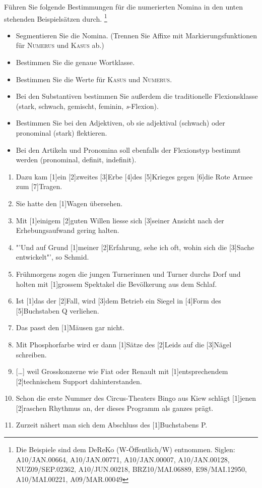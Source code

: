 \begin{sloppypar}

\Uebung \label{u81} Führen Sie folgende Bestimmungen für die numerierten Nomina in den unten stehenden Beispielsätzen durch.%
\footnote{Die Beispiele sind dem DeReKo (W-Öffentlich\slash W) entnommen.
Siglen: A10\slash JAN.00664, A10\slash JAN.00771, A10\slash JAN.00007, A10\slash JAN.00128, NUZ09\slash SEP.02362, A10\slash JUN.00218, BRZ10\slash MAI.06889, E98\slash MAI.12950, A10\slash MAI.00221, A09\slash MAR.00049}

\begin{itemize}\Lf
  \item Segmentieren Sie die Nomina. (Trennen Sie Affixe mit Markierungsfunktionen für \textsc{Numerus} und \textsc{Kasus} ab.)
  \item Bestimmen Sie die genaue Wortklasse.
  \item Bestimmen Sie die Werte für \textsc{Kasus} und \textsc{Numerus}.
  \item Bei den Substantiven bestimmen Sie außerdem die traditionelle Flexionsklasse (stark, schwach, gemischt, feminin, \textit{s}-Flexion).
  \item Bestimmen Sie bei den Adjektiven, ob sie adjektival (schwach) oder pronominal (stark) flektieren.
  \item Bei den Artikeln und Pronomina soll ebenfalls der Flexionstyp bestimmt werden (pronominal, definit, indefinit).
\end{itemize}

\begin{enumerate}\Lf
  \item Dazu kam [1]ein [2]zweites [3]Erbe [4]des [5]Krieges gegen [6]die Rote Armee zum [7]Tragen.
  \item Sie hatte den [1]Wagen übersehen.
  \item Mit [1]einigem [2]guten Willen liesse sich [3]seiner Ansicht nach der Erhebungsaufwand gering halten.
  \item "'Und auf Grund [1]meiner [2]Erfahrung, sehe ich oft, wohin sich die [3]Sache entwickelt"', so Schmid.
  \item Frühmorgens zogen die jungen Turnerinnen und Turner durchs Dorf und holten mit [1]grossem Spektakel die Bevölkerung aus dem Schlaf.
  \item Ist [1]das der [2]Fall, wird [3]dem Betrieb ein Siegel in [4]Form des [5]Buchstaben Q verliehen.
  \item Das passt den [1]Mäusen gar nicht.
  \item Mit Phosphorfarbe wird er dann [1]Sätze des [2]Leids auf die [3]Nägel schreiben.
  \item{}[\ldots] weil Grosskonzerne wie Fiat oder Renault mit [1]entsprechendem [2]technischem Support dahinterstanden.
  \item Schon die erste Nummer des Circus-Theaters Bingo aus Kiew schlägt [1]jenen [2]raschen Rhythmus an, der dieses Programm als ganzes prägt.
  \item Zurzeit nähert man sich dem Abschluss des [1]Buchstabens P.
\end{enumerate}


\end{sloppypar}
